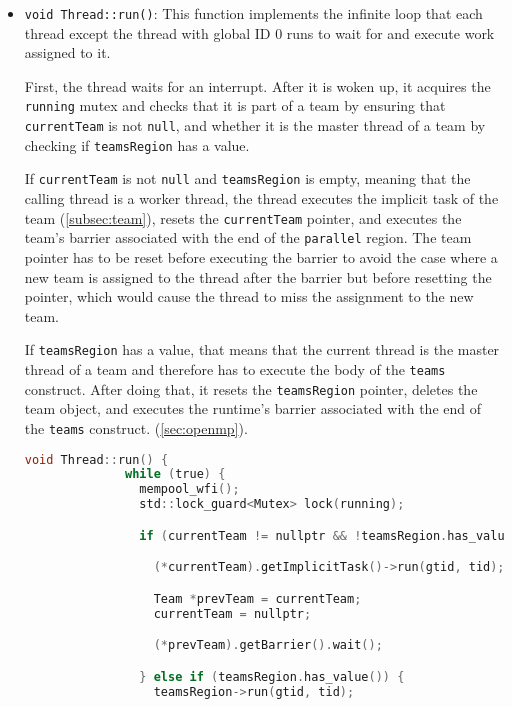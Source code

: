 \begin{itemize}
	\item \texttt{void Thread::run()}: This function implements the infinite loop that each thread
	      except the thread with global ID 0 runs to wait for and execute work assigned to it.

	      First, the thread waits for an interrupt. After it is woken up, it acquires the \texttt{running}
	      mutex and checks that it is part of a team by ensuring that \texttt{currentTeam} is not
	      \texttt{null}, and whether it is the master thread of a team by checking if
	      \texttt{teamsRegion} has a value.

	      If \texttt{currentTeam} is not \texttt{null} and \texttt{teamsRegion} is empty, meaning
	      that the calling thread is a worker thread, the thread executes the implicit task of the
	      team (\cref{subsec:team}), resets the \texttt{currentTeam} pointer, and executes the team's
	      barrier associated with the end of the \texttt{parallel} region. The team pointer has to
	      be reset before executing the barrier to avoid the case where a new team is assigned to
	      the thread after the barrier but before resetting the pointer, which would cause the
	      thread to miss the assignment to the new team.

	      If \texttt{teamsRegion} has a value, that means that the current thread is the master
	      thread of a team and therefore has to execute the body of the \texttt{teams} construct.
	      After doing that, it resets the \texttt{teamsRegion} pointer, deletes the team object, and
	      executes the runtime's barrier associated with the end of the \texttt{teams} construct.
	      (\cref{sec:openmp}).

	      \begin{lstlisting}[language=C, caption={Thread::run}, label={lst:thread-run},
          escapechar=@]
            void Thread::run() {
              while (true) {
                mempool_wfi();
                std::lock_guard<Mutex> lock(running);

                if (currentTeam != nullptr && !teamsRegion.has_value()) {

                  (*currentTeam).getImplicitTask()->run(gtid, tid);

                  Team *prevTeam = currentTeam;
                  currentTeam = nullptr;

                  (*prevTeam).getBarrier().wait();

                } else if (teamsRegion.has_value()) {
                  teamsRegion->run(gtid, tid);


\end{lstlisting}
\end{itemize}
